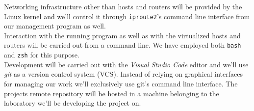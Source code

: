\documentclass[12pt]{article}
\begin{document}
        Networking infrastructure other than hosts and routers will be provided by the Linux kernel and we'll control it through \texttt{iproute2}'s command line interface from our management program as well.\\

        Interaction with the running program as well as with the virtualized hosts and routers will be carried out from a command line. We have employed both \texttt{bash} and \texttt{zsh} for this purpose.\\

        Development will be carried out with the \textit{Visual Studio Code} editor and we'll use \textit{git} as a version control system (VCS). Instead of relying on graphical interfaces for managing our work we'll exclusively use git's command line interface. The projects remote repository will be hosted in a machine belonging to the laboratory we'll be developing the project on.\\

    
    {}
\end{document}
